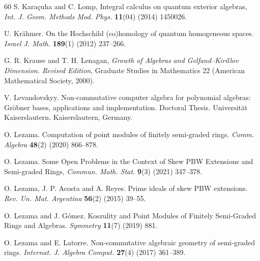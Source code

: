 \documentclass{amsart}
\theoremstyle{definition}
\theoremstyle{remark}
\numberwithin{equation}{section}
\begin{document}
\begin{thebibliography}{60}
 S. Kara\c cuha and C. Lomp, Integral calculus on quantum exterior algebras, {\em Int. J. Geom. Methods Mod. Phys.} {\bf 11}(04) (2014) 1450026.

 U. Kr\"ahmer. On the Hochschild (co)homology of quantum homogeneous spaces. {\em Israel J. Math.} {\bf 189}(1) (2012) 237--266.

 G. R. Krause and T. H. Lenagan, {\em Growth of Algebras and Gelfand–Kirillov Dimension. Revised Edition}, Graduate Studies in Mathematics 22 (American Mathematical Society, 2000).





 V. Levandovskyy. Non-commutative computer algebra for polynomial algebras: Gr\"obner bases, applications and implementation. Doctoral Thesis. Universit\"at Kaiserslautern. Kaiserslautern, Germany.

 O. Lezama. Computation of point modules of finitely semi-graded rings. {\em Comm. Algebra} {\bf 48}(2) (2020) 866--878.

 O. Lezama. Some Open Problems in the Context of Skew PBW Extensions and Semi-graded Rings, {\em Commun. Math. Stat.} {\bf 9}(3) (2021) 347--378.

 O. Lezama, J. P. Acosta and A. Reyes. Prime ideals of skew PBW extensions. {\em Rev. Un. Mat. Argentina} {\bf 56}(2) (2015) 39--55.

 O. Lezama and J. G\'omez. Koszulity and Point Modules of Finitely Semi-Graded Rings and Algebras. {\em Symmetry} {\bf 11}(7) (2019) 881.

 O. Lezama and E. Latorre. Non-commutative algebraic geometry of semi-graded rings. {\em Internat. J. Algebra Comput.} {\bf 27}(4) (2017) 361--389.


\end{thebibliography}
\end{document}
